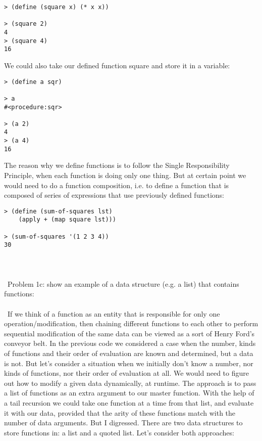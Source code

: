 \documentclass{article}
\begin{document}
\begin{verbatim} 
> (define (square x) (* x x))

> (square 2)
4
> (square 4)
16
\end{verbatim}

We could also take our defined function square and store it in a variable:

\begin{verbatim} 
> (define a sqr)

> a
#<procedure:sqr>

> (a 2)
4
> (a 4)
16
\end{verbatim}

The reason why we define functions is to follow the Single Responsibility Principle, when each function is doing only one thing. But at certain point we would need to do a function composition, i.e. to define a function that is composed of series of expressions that use previously defined functions:

\begin{verbatim} 
> (define (sum-of-squares lst)
    (apply + (map square lst)))
    
> (sum-of-squares '(1 2 3 4))
30
\end{verbatim}
\paragraph{}\
\paragraph{}\
Problem 1c: show an example of a data structure (e.g. a list) that contains functions:
\paragraph{}\
If we think of a function as an entity that is responsible for only one operation/modification, then chaining different functions to each other to perform sequential modification of the same data can be viewed as a sort of Henry Ford's conveyor belt. In the previous code we considered a case when the number, kinds of functions and their order of evaluation are known and determined, but a data is not. But let's consider a situation when we initially don't know a number, nor kinds of functions, nor their order of evaluation at all. We would need to figure out how to modify a given data dynamically, at runtime. The approach is to pass a list of functions as an extra argument to our master function. With the help of a tail recursion we could take one function at a time from that list, and evaluate it with our data, provided that the arity of these functions match with the number of data arguments. But I digressed. There are two data structures to store functions in: a list and a quoted list. Let's consider both approaches:
\end{document}
